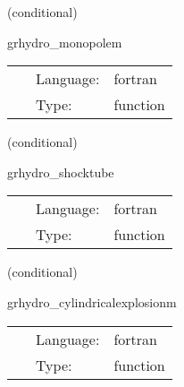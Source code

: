 \documentclass{article}
\begin{document}
\vspace{5mm}

   (conditional) 

\hspace{5mm} grhydro\_monopolem 

\hspace{5mm}{\it monopole initial data } 


\hspace{5mm}

 \begin{tabular*}{160mm}{cll} 
~ & Language:  & fortran \\ 
~ & Type:  & function \\ 
\end{tabular*} 


\vspace{5mm}

   (conditional) 

\hspace{5mm} grhydro\_shocktube 

\hspace{5mm}{\it shocktube initial data } 


\hspace{5mm}

 \begin{tabular*}{160mm}{cll} 
~ & Language:  & fortran \\ 
~ & Type:  & function \\ 
\end{tabular*} 


\vspace{5mm}

   (conditional) 

\hspace{5mm} grhydro\_cylindricalexplosionm 

\hspace{5mm}{\it cylindrical explosion initial data - mhd-only } 


\hspace{5mm}

 \begin{tabular*}{160mm}{cll} 
~ & Language:  & fortran \\ 
~ & Type:  & function \\ 
\end{tabular*} 


\vspace{5mm}
\end{document}
